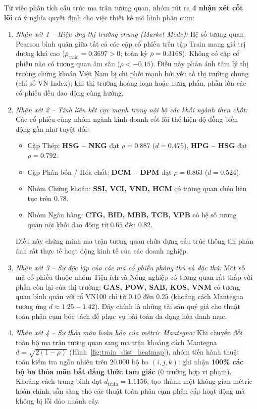 \documentclass[12pt,a4paper,oneside,openany]{report}
\begin{document}
Từ việc phân tích cấu trúc ma trận tương quan, nhóm rút ra \textbf{4 nhận xét cốt lõi} có ý nghĩa quyết định cho việc thiết kế mô hình phân cụm:
\begin{enumerate}
  \item \textit{Nhận xét 1 -- Hiệu ứng thị trường chung (Market Mode):} Hệ số tương quan Pearson bình quân giữa tất cả các cặp cổ phiếu trên tập Train mang giá trị dương khá cao ($\bar{\rho}_{\text{train}} = 0.3697 > 0$; toàn kỳ $\bar{\rho} = 0.3168$). Không có cặp cổ phiếu nào có tương quan âm sâu ($\rho < -0.15$). Điều này phản ánh tâm lý thị trường chứng khoán Việt Nam bị chi phối mạnh bởi yếu tố thị trường chung (chỉ số VN-Index); khi thị trường hoảng loạn hoặc hưng phấn, phần lớn các cổ phiếu đều dao động cùng hướng.
  \item \textit{Nhận xét 2 -- Tính liên kết cực mạnh trong nội bộ các khối ngành then chốt:} 
  Các cổ phiếu cùng nhóm ngành kinh doanh cốt lõi thể hiện độ đồng biến động gần như tuyệt đối:
  \begin{itemize}
    \item Cặp Thép: \textbf{HSG -- NKG} đạt $\rho = 0.887$ ($d = 0.475$), \textbf{HPG -- HSG} đạt $\rho = 0.792$.
    \item Cặp Phân bón / Hóa chất: \textbf{DCM -- DPM} đạt $\rho = 0.863$ ($d = 0.524$).
    \item Nhóm Chứng khoán: \textbf{SSI, VCI, VND, HCM} có tương quan chéo liên tục trên $0.78$.
    \item Nhóm Ngân hàng: \textbf{CTG, BID, MBB, TCB, VPB} có hệ số tương quan nội khối dao động từ $0.65$ đến $0.82$.
  \end{itemize}
  Điều này chứng minh ma trận tương quan chứa đựng cấu trúc thông tin phản ánh rất thực tế hoạt động kinh tế của các doanh nghiệp.
  \item \textit{Nhận xét 3 -- Sự độc lập của các mã cổ phiếu phòng thủ và đặc thù:}
  Một số mã cổ phiếu thuộc nhóm Tiện ích và Nông nghiệp có tương quan rất thấp với phần còn lại của thị trường: \textbf{GAS, POW, SAB, KOS, VNM} có tương quan bình quân với rổ VN100 chỉ từ $0.10$ đến $0.25$ (khoảng cách Mantegna tương ứng $d \approx 1.25 - 1.42$). Đây chính là những tài sản quý giá cho thuật toán phân cụm bóc tách để phục vụ bài toán đa dạng hóa danh mục.
  \item \textit{Nhận xét 4 -- Sự thỏa mãn hoàn hảo của mêtric Mantegna:}
  Khi chuyển đổi toàn bộ ma trận tương quan sang ma trận khoảng cách Mantegna $d = \sqrt{2(1-\rho)}$ (Hình~\ref{fig:train_dist_heatmap}), nhóm tiến hành thuật toán kiểm tra ngẫu nhiên trên $20.000$ bộ ba $(i, j, k)$: ghi nhận \textbf{100\% các bộ ba thỏa mãn bất đẳng thức tam giác} ($0$ trường hợp vi phạm). Khoảng cách trung bình đạt $\bar{d}_{\text{train}} = 1.1156$, tạo thành một không gian mêtric hoàn chỉnh, sẵn sàng cho các thuật toán phân cụm phân cấp hoạt động mà không bị lỗi đảo nhánh cây.
\end{enumerate}
\end{document}
